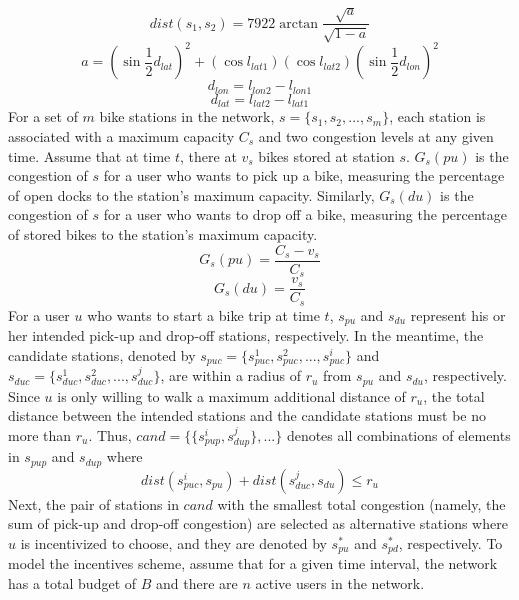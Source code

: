 \documentclass[times, 10pt,twocolumn]{article}
\begin{document}
\begin{equation}
dist(s_1,s_2) = 7922\arctan{\frac{\sqrt{a}}{\sqrt{1-a}}}
\end{equation}
\begin{equation}
a = (\sin{\frac{1}{2}d_{lat}})^2+(\cos{l_{lat1}})(\cos{l_{lat2}})(\sin{\frac{1}{2}d_{lon}})^2
\end{equation}
\begin{equation}
d_{lon} = l_{lon2} - l_{lon1}
\end{equation}
\begin{equation}
d_{lat} = l_{lat2} - l_{lat1}
\end{equation}
For a set of $m$ bike stations in the network, $s = \{s_1, s_2, ..., s_m\}$, each station is associated with a maximum capacity $C_s$ and two congestion levels at any given time. Assume that at time $t$, there at $v_s$ bikes stored at station $s$. $G_s(pu)$ is the congestion of $s$ for a user who wants to pick up a bike, measuring the percentage of open docks to the station's maximum capacity. Similarly, $G_s(du)$ is the congestion of $s$ for a user who wants to drop off a bike, measuring the percentage of stored bikes to the station's maximum capacity.
\begin{equation}
G_s(pu) = \frac{C_s-v_s}{C_s}
\end{equation}
\begin{equation}
G_s(du) = \frac{v_s}{C_s}
\end{equation}
For a user $u$ who wants to start a bike trip at time $t$, $s_{pu}$ and $s_{du}$ represent his or her intended pick-up and drop-off stations, respectively. In the meantime, the candidate stations, denoted by $s_{puc} = \{s_{puc}^1, s_{puc}^2, ..., s_{puc}^i\}$ and $s_{duc} = \{s_{duc}^1, s_{duc}^2, ..., s_{duc}^j\}$, are within a radius of $r_u$ from $s_{pu}$ and $s_{du}$, respectively. Since $u$ is only willing to walk a maximum additional distance of $r_u$, the total distance between the intended stations and the candidate stations must be no more than $r_u$. Thus, $cand = \{\{s_{pup}^i,s_{dup}^j\}, ...\}$ denotes all combinations of elements in $s_{pup}$ and $s_{dup}$ where
\begin{equation}
dist(s_{puc}^i, s_{pu}) + dist(s_{duc}^j, s_{du}) \leq r_u
\end{equation}
Next, the pair of stations in $cand$ with the smallest total congestion (namely, the sum of pick-up and drop-off congestion) are selected as alternative stations where $u$ is incentivized to choose, and they are denoted by $s_{pu}^*$ and $s_{pd}^*$, respectively. To model the incentives scheme, assume that for a given time interval, the network has a total budget of $B$ and there are $n$ active users in the network.
\end{document}

